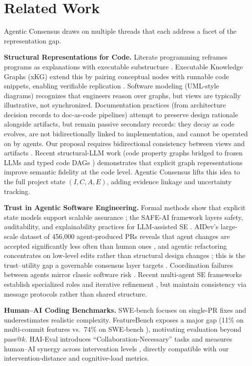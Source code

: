 \section{Related Work}
Agentic Consensus draws on multiple threads that each address a facet of the representation gap.

\textbf{Structural Representations for Code.}
Literate programming reframes programs as explanations with executable substructure \cite{knuth1984}. Executable Knowledge Graphs (xKG) extend this by pairing conceptual nodes with runnable code snippets, enabling verifiable replication \cite{luo2025xkg}.
Software modeling (UML-style diagrams) recognizes that engineers reason over graphs, but views are typically illustrative, not synchronized.
Documentation practices (from architecture decision records to doc-as-code pipelines) attempt to preserve design rationale alongside artifacts, but remain passive secondary records: they decay as code evolves, are not bidirectionally linked to implementation, and cannot be operated on by agents.
Our proposal requires bidirectional consistency between views and artifacts \cite{czarnecki2009bidirectional}. Recent structural-LLM work (code property graphs bridged to frozen LLMs \cite{yamaguchi2014cpg,chen2025cgbridge} and typed code DAGs \cite{chivukula2025agint}) demonstrates that explicit graph representations improve semantic fidelity at the code level. Agentic Consensus lifts this idea to the full project state $(I,C,A,E)$, adding evidence linkage and uncertainty tracking.

\textbf{Trust in Agentic Software Engineering.}
Formal methods show that explicit state models support scalable assurance \cite{clarke1999}; the SAFE-AI framework layers safety, auditability, and explainability practices for LLM-assisted SE \cite{navneet2025safeai}.
AIDev's large-scale dataset of 456{,}000 agent-produced PRs reveals that agent changes are accepted significantly less often than human ones \cite{li2025aidev}, and agentic refactoring concentrates on low-level edits rather than structural design changes \cite{horikawa2025refactoring}; this is the trust--utility gap a governable consensus layer targets \cite{lee2004trust}.
Coordination failures between agents mirror classic software risk \cite{brooks1975}. Recent multi-agent SE frameworks establish specialized roles and iterative refinement \cite{hong2024metagpt,qian2024chatdev,bandara2025agentsway,guo2025agentsesurvey}, but maintain consistency via message protocols rather than shared structure.

\textbf{Human--AI Coding Benchmarks.}
SWE-bench \cite{jimenez2024swebench} focuses on single-PR fixes and underestimates realistic complexity. FeatureBench exposes a major gap (11\% on multi-commit features vs.\ 74\% on SWE-bench \cite{zhou2026featurebench}), motivating evaluation beyond pass@$k$.
HAI-Eval introduces ``Collaboration-Necessary'' tasks and measures human--AI synergy across intervention levels \cite{luo2025haieval}, directly compatible with our intervention-distance and cognitive-load metrics.
